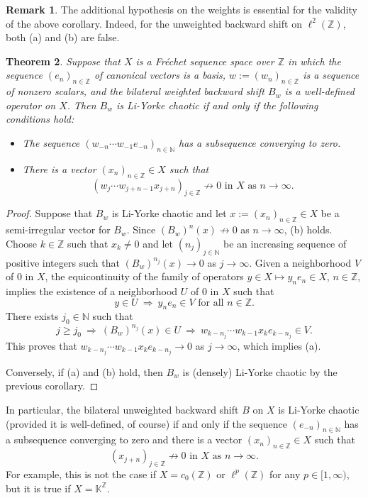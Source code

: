 \documentclass[12pt]{amsart}
\theoremstyle{theorem}
\newtheorem{theorem}{Theorem}%
\theoremstyle{definition}
\newtheorem{remark}[theorem]{Remark}
\theoremstyle{remark} \theoremstyle{question} \theoremstyle{example}
\newcommand{\N}{\mathbb{N}}
\newcommand{\Z}{\mathbb{Z}}
\newcommand{\K}{\mathbb{K}}
\begin{document}
\begin{remark}
The additional hypothesis on the weights is essential for the validity of the above corollary.
Indeed, for the unweighted backward shift on $\ell^2(\Z)$, both (a) and (b) are false.
\end{remark}

\begin{theorem}\label{BWBSThm}
Suppose that $X$ is a Fr\'echet sequence space over $\Z$ in which the sequence $(e_n)_{n \in \Z}$ of canonical vectors is a basis,
$w\!:= (w_n)_{n \in \Z}$ is a sequence of nonzero scalars, and the bilateral weighted backward shift $B_w$ is a well-defined 
operator on $X$. Then $B_w$ is Li-Yorke chaotic if and only if the following conditions hold:
\begin{itemize}
\item [\rm (a)] The sequence $(w_{-n} \cdots w_{-1} e_{-n})_{n \in \N}$ has a subsequence converging to zero.
\item [\rm (b)] There is a vector $(x_n)_{n \in \Z} \in X$ such that
\[
(w_j \cdots w_{j+n-1} x_{j+n})_{j \in \Z} \not\to 0 \text{ in } X \text{ as } n \to \infty.
\]
\end{itemize}
\end{theorem}

\begin{proof}
Suppose that $B_w$ is Li-Yorke chaotic and let $x\!:= (x_n)_{n \in \Z} \in X$ be a semi-irregular vector for $B_w$.
Since $(B_w)^n(x) \not\to 0$ as $n \to \infty$, (b) holds.
Choose $k \in \Z$ such that $x_k \neq 0$ and let $(n_j)_{j \in \N}$ be an increasing sequence of positive integers such that
$(B_w)^{n_j}(x) \to 0$ as $j \to \infty$.
Given a neighborhood $V$ of $0$ in $X$, the equicontinuity of the family of operators $y \in X \mapsto y_n e_n \in X$, $n \in \Z$,
implies the existence of a neighborhood $U$ of $0$ in $X$ such that
\[
y \in U \ \Longrightarrow \ y_ne_n \in V \text{ for all } n \in \Z.
\]
There exists $j_0 \in \N$ such that
\[
j \geq j_0 \ \Longrightarrow \ (B_w)^{n_j}(x) \in U \ \Longrightarrow \ w_{k-n_j} \cdots w_{k-1} x_k e_{k-n_j} \in V.
\]
This proves that $w_{k-n_j} \cdots w_{k-1} x_k e_{k-n_j} \to 0$ as $j \to \infty$, which implies (a).

Conversely, if (a) and (b) hold, then $B_w$ is (densely) Li-Yorke chaotic by the previous corollary.
\end{proof}

In particular, the bilateral unweighted backward shift $B$ on $X$ is Li-Yorke chaotic (provided it is well-defined, of course)
if and only if the sequence $(e_{-n})_{n \in \N}$ has a subsequence converging to zero and there is a vector 
$(x_n)_{n \in \Z} \in X$ such that
\[
(x_{j+n})_{j \in \Z} \not\to 0 \text{ in } X \text{ as } n \to \infty.
\]
For example, this is not the case if $X = c_0(\Z)$ or $\ell^p(\Z)$ for any $p \in [1,\infty)$, but it is true if $X = \K^\Z$.
\end{document}
